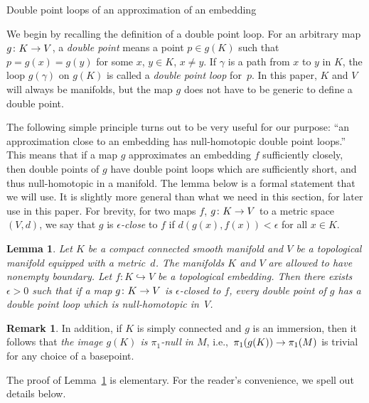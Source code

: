 \documentclass[11pt]{amsart}
\makeatletter
\def\subsection{\@startsection{subsection}{2}%
  \z@{-.8\linespacing\@plus-.3\linespacing}{.5\linespacing\@plus.2\linespacing}%
  {\normalfont\bfseries\large}}
\def\to{\mathchoice{\longrightarrow}{\rightarrow}{\rightarrow}{\rightarrow}}
\newtheorem{lemma}[theorem]{Lemma}
\theoremstyle{definition}
\newtheorem{remark}[theorem]{Remark}
\theoremstyle{theorem-giventitle}
\theoremstyle{definition-giventitle}
\numberwithin{equation}{section}
\makeatother
\begin{document}
\subsection{Double point loops of an approximation of an embedding}
\label{subsection:double-point-loop-approx-embedding}

We begin by recalling the definition of a double point loop.
For an arbitrary map $g\colon K\to V$, a \emph{double point} means a point $p\in g(K)$ such that $p=g(x)=g(y)$ for some $x$, $y\in K$, $x\ne y$.
If $\gamma$ is a path from $x$ to $y$ in $K$, the loop $g(\gamma)$ on $g(K)$ is called a \emph{double point loop} for~$p$.
In this paper, $K$ and $V$ will always be manifolds, but the map $g$ does not have to be generic to define a double point.

The following simple principle turns out to be very useful for our purpose:
``an approximation close to an embedding has null-homotopic double point loops.''
This means that if a map $g$ approximates an embedding $f$ sufficiently closely, then double points of $g$ have double point loops which are sufficiently short, and thus null-homotopic in a manifold.
The lemma below is a formal statement that we will use.
It is slightly more general than what we need in this section, for later use in this paper.
For brevity, for two maps $f$, $g\colon K\to V$ to a metric space $(V,d)$, we say that $g$ is \emph{$\epsilon$-close} to $f$ if $d(g(x),f(x))<\epsilon$ for all $x\in K$.

\begin{lemma}
  \label{lemma:pi_1-null-approx}
  Let $K$ be a compact connected smooth manifold and $V$ be a topological manifold equipped with a metric~$d$.
  The manifolds $K$ and $V$ are allowed to have nonempty boundary.
  Let $f\colon K\hookrightarrow V$ be a topological embedding.
  Then there exists $\epsilon>0$ such that if a map $g\colon K\to V$ is $\epsilon$-closed to $f$, every double point of $g$ has a double point loop which is null-homotopic in~$V$.
\end{lemma}

\begin{remark}
  In addition, if $K$ is simply connected and $g$ is an immersion, then it follows that \emph{the image $g(K)$ is $\pi_1$-null in $M$}, i.e.,\ $\pi_1(g(K)) \to \pi_1(M)$ is trivial for any choice of a basepoint.
\end{remark}

The proof of Lemma~\ref{lemma:pi_1-null-approx} is elementary.
For the reader's convenience, we spell out details below.
\end{document}
